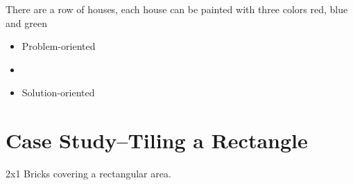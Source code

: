 There are a row of houses, each house can be painted with three colors red, blue and green
\label{Evernote:Paint House (I and II)}
\begin{itemize}
    \item Problem-oriented\label{Evernote:Split "bothearthandsaturnspin" into words word break wordbreak}
    \item \item Solution-oriented
\end{itemize}

\section{Case Study--Tiling a Rectangle} \label{sec:tiling-rectangle}
\label{Evernote:2x1 brick paving problem tiling}
2x1 Bricks covering a rectangular area.
